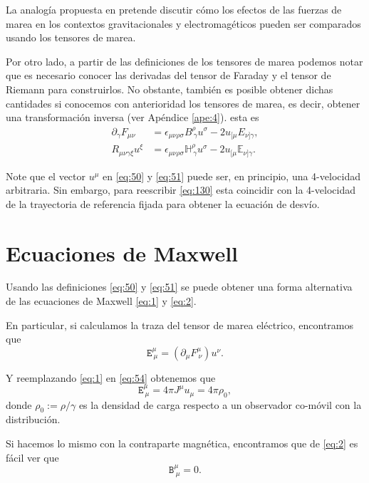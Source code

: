 La analogía propuesta en \cite{Costa-Herdeiro} pretende discutir cómo los efectos de las fuerzas de marea en los contextos gravitacionales y electromagéticos pueden ser comparados usando los tensores de marea.

Por otro lado, a partir de las definiciones de los tensores de marea podemos notar que es necesario conocer las derivadas del tensor de Faraday y el tensor de Riemann para construirlos. No obstante, también es posible obtener dichas cantidades si conocemos con anterioridad los tensores de marea, es decir, obtener una transformación inversa (ver Apéndice \ref{ape:4}). esta es
\begin{align}
\label{eq:52}
\partial_{\gamma} F_{\mu \nu} &= \epsilon_{\mu \nu \rho \sigma} \mathit{B}^{\rho}_{\ \gamma} u^{\sigma} - 2u_{[\mu} \mathit{E}_{\nu] \gamma},\\
\label{eq:53}
R_{\mu \nu \gamma \xi} u^{\xi} &= \epsilon_{\mu \nu \rho \sigma} \mathbb{H}^{\rho}_{\ \gamma} u^{\sigma} - 2u_{[\mu} \mathbb{E}_{\nu] \gamma}.
\end{align}

Note que el vector $u^{\mu}$ en \eqref{eq:50} y \eqref{eq:51} puede ser, en principio, una 4-velocidad arbitraria. Sin embargo, para reescribir \eqref{eq:130} esta coincidir con la 4-velocidad de la trayectoria de referencia fijada para obtener la ecuación de desvío.  

\section{Ecuaciones de Maxwell}

Usando las definiciones \eqref{eq:50} y \eqref{eq:51} se puede obtener una forma alternativa de las ecuaciones de Maxwell \eqref{eq:1} y \eqref{eq:2}.

En particular, si calculamos la traza del tensor de marea eléctrico, encontramos que
\begin{equation}
\label{eq:54}
\mathtt{E}^{\mu}_{\ \mu} = \left( \partial_{\mu} F^{\mu}_{\ \nu} \right) u^{\nu}.
\end{equation}

Y reemplazando \eqref{eq:1} en \eqref{eq:54} obtenemos que
\begin{equation}
\mathtt{E}^{\mu}_{\ \mu} = 4\pi J^{\mu} u_{\mu} = 4\pi \rho_0,
\end{equation}
donde $\rho_0 := \rho / \gamma$ es la densidad de carga respecto a un observador co-móvil con la distribución.

Si hacemos lo mismo con la contraparte magnética, encontramos que de \eqref{eq:2} es fácil ver que
\begin{equation}
\mathtt{B}^{\mu}_{\ \mu} = 0.
\end{equation}

